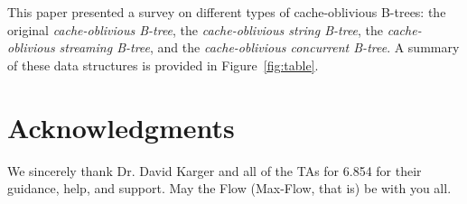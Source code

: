 \documentclass[preprint]{style}
\begin{document}
This paper presented a survey on different types of cache-oblivious B-trees: the 
original \textit{cache-oblivious B-tree}, the \textit{cache-oblivious string
B-tree}, the \textit{cache-oblivious streaming B-tree}, and the \textit{cache-oblivious
concurrent B-tree}. A summary of these data structures is provided
in Figure~\ref{fig:table}.



\section{Acknowledgments}

We sincerely thank Dr. David Karger and all of the TAs for 6.854 
for their guidance, help, and support. May the Flow (Max-Flow, that is) be with you all.

%



\end{document}

